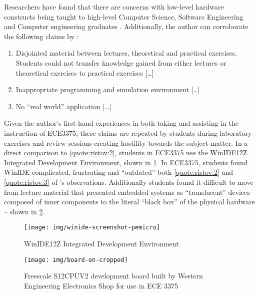 Researchers have found that there are concerns with low-level hardware constructs being taught to high-level Computer Science, Software Engineering and Computer engineering graduates \cite{Ristov2011, Stolikj2011}. Additionally, the author can corroborate the following claims by \cite{Ristov2011}: 
\begin{displayquote}
    \begin{enumerate}
        \item Disjointed material between lectures, theoretical and practical
        exercises. Students could not transfer knowledge gained from either lectures or theoretical exercises to practical exercises [\dots] 
            \label{quote:ristov:1}
        \item Inappropriate programming and simulation environment [\dots] 
            \label{quote:ristov:2}
        \item No ``real world'' application [\dots] 
            \label{quote:ristov:3}
    \end{enumerate}
\end{displayquote}
Given the author's first-hand experiences in both taking and assisting in the instruction of ECE3375, these claims are repeated by students during laboratory exercises and review sessions creating hostility towards the subject matter. In a direct comparison to \cref{quote:ristov:2}, students in ECE3375 use the WinIDE12Z Integrated Development Environment\cite{winide}, shown in \cref{fig:winide-screenshot-pemicro}. In ECE3375, students found WinIDE complicated, frustrating and ``outdated'' \cite{evals:ece3375-2013, evals:ece3375-2014} both \cref{quote:ristov:2} and \cref{quote:ristov:3} of \cite{Ristov2011}'s observations. Additionally students found it difficult to move from lecture material that presented embedded systems as ``translucent'' devices composed of inner components to the literal ``black box'' of the physical hardware -- shown in \cref{fig:hc12-board}. 

\begin{figure}[!ht]
    \centering
    \texttt{[image: img/winide-screenshot-pemicro]}
    \caption{WinIDE12Z Integrated Development Environment\cite{winide-screenshot}}
    \label{fig:winide-screenshot-pemicro}
\end{figure}

\begin{figure}[!hb]
    \centering
    \texttt{[image: img/board-on-cropped]}
    \caption{Freescale S12CPUV2 development board built by Western Engineering Electronics Shop for use in ECE 3375}
    \label{fig:hc12-board}
\end{figure}


